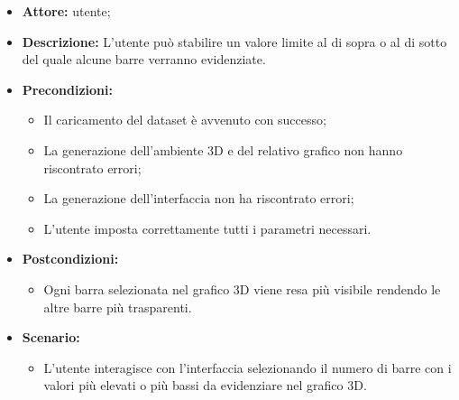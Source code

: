 \begin{itemize}    
    \item \textbf{Attore:} utente;
    \item \textbf{Descrizione:} L'utente può stabilire un valore limite al di sopra o al di sotto del quale alcune barre verranno evidenziate.
    \item \textbf{Precondizioni:}    
        \begin{itemize}
            \item Il caricamento del dataset è avvenuto con successo;
            \item La generazione dell'ambiente 3D e del relativo grafico non hanno riscontrato errori;
            \item La generazione dell'interfaccia non ha riscontrato errori;
            \item L'utente imposta correttamente tutti i parametri necessari.
        \end{itemize}    
    \item \textbf{Postcondizioni:}
        \begin{itemize}
            \item Ogni barra selezionata nel grafico 3D viene resa più visibile rendendo le altre barre più trasparenti.
        \end{itemize}    
    \item \textbf{Scenario:} 
        \begin{itemize}
            \item L'utente interagisce con l'interfaccia selezionando il numero di barre con i valori più elevati o più bassi da evidenziare nel grafico 3D.
        \end{itemize}
\end{itemize}
